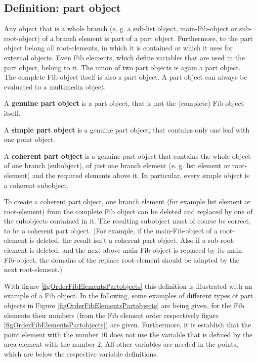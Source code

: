 \subsection{Definition: part object}

Any object that is a whole branch (e. g. a sub-list object, main-Fib-object or sub-root-object) of a branch element is part of a part object. Furthermore, to the part object belong all root-elements, in which it is contained or which it uses for external objects. Even Fib elements, which define variables that are used in the part object, belong to it.
The union of two part objects is again a part object.
The complete Fib object itself is also a part object.
A part object can always be evaluated to a multimedia object.

A \textbf{genuine part object} is a part object, that is not the (complete) Fib object itself.

A \textbf{simple part object} is a genuine part object, that contains only one leaf with one point object.

A \textbf{coherent part object} is a genuine part object that contains the whole object of one branch (subobject), of just one branch element (e. g. list element or root-element) and the required elements above it. In particular, every simple object is a coherent subobject.

To create a coherent part object, one branch element (for example list element or root-element) from the complete Fib object can be deleted and replaced by one of the subobjects contained in it. The resulting subobject must of course be correct, to be a coherent part object. (For example, if the main-Fib-object of a root-element is deleted, the result isn't a coherent part object. Also if a sub-root-element is deleted, and the next above main-Fib-object is replaced by its main-Fib-object, the domains of the replace root-element should be adapted by the next root-element.)

With figure \ref{figOrderFibElementsPartobjects} this definition is illustrated with an example of a Fib object. In the following, some examples of different types of part objects in Figure \ref{figOrderFibElementsPartobjects} are being given, for the Fib elements their numbers (from the Fib element order respectively figure \ref{figOrderFibElementsPartobjects}) are given. Furthermore, it is establish that the point element with the number $10$ does not use the variable that is defined by the area element with the number $2$. All other variables are needed in the points, which are below the respective variable definitions.


